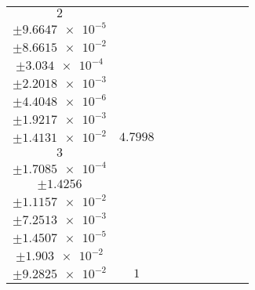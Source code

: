 \documentclass[8pt]{article}
\begin{document}
\begin{longtable}[l]{c c c c c c c c c}
$\num{2}$ & \begin{tabular}[c]{@{}c@{}}$\num{6.0853e-2}$ \\ $\pm\num{9.6647e-5}$\end{tabular} & \begin{tabular}[c]{@{}c@{}}$\num{-0.84239}$ \\ $\pm\num{8.6615e-2}$\end{tabular} & \begin{tabular}[c]{@{}c@{}}$\num{-6.9951}$ \\ $\pm\num{3.034e-4}$\end{tabular} & \begin{tabular}[c]{@{}c@{}}$\num{1.5589e+3}$ \\ $\pm\num{2.2018e-3}$\end{tabular} & \begin{tabular}[c]{@{}c@{}}$\num{3.1186}$ \\ $\pm\num{4.4048e-6}$\end{tabular} & \begin{tabular}[c]{@{}c@{}}$\num{1.1764}$ \\ $\pm\num{1.9217e-3}$\end{tabular} & \begin{tabular}[c]{@{}c@{}}$\num{4.0676}$ \\ $\pm\num{1.4131e-2}$\end{tabular} & $\num{4.7998}$\\
$\num{3}$ & \begin{tabular}[c]{@{}c@{}}$\num{1.3962e-2}$ \\ $\pm\num{1.7085e-4}$\end{tabular} & \begin{tabular}[c]{@{}c@{}}$\num{-0.71928}$ \\ $\pm\num{1.4256}$\end{tabular} & \begin{tabular}[c]{@{}c@{}}$\num{-5.508}$ \\ $\pm\num{1.1157e-2}$\end{tabular} & \begin{tabular}[c]{@{}c@{}}$\num{1.5691e+3}$ \\ $\pm\num{7.2513e-3}$\end{tabular} & \begin{tabular}[c]{@{}c@{}}$\num{3.139}$ \\ $\pm\num{1.4507e-5}$\end{tabular} & \begin{tabular}[c]{@{}c@{}}$\num{2.4445}$ \\ $\pm\num{1.903e-2}$\end{tabular} & \begin{tabular}[c]{@{}c@{}}$\num{3.4572}$ \\ $\pm\num{9.2825e-2}$\end{tabular} & $\num{1}$\\

\end{longtable}
\end{document}
